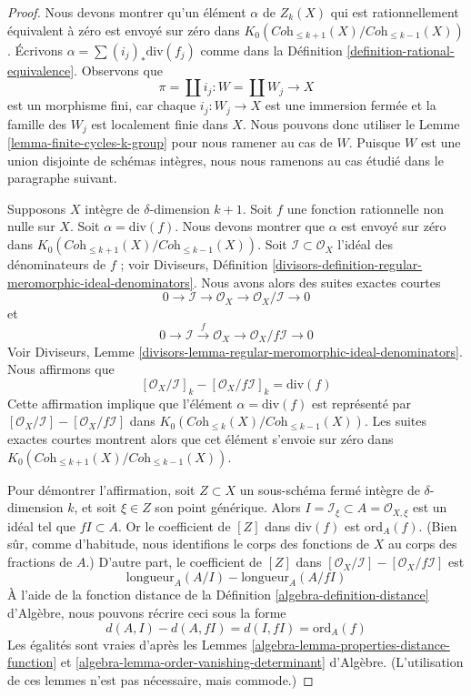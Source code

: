 \begin{proof}
Nous devons montrer qu'un élément $\alpha$ de $Z_k(X)$ qui est rationnellement
équivalent à zéro est envoyé sur zéro dans
$K_0(\textit{Coh}_{\leq k + 1}(X)/\textit{Coh}_{\leq k - 1}(X))$.
Écrivons $\alpha = \sum (i_j)_*\text{div}(f_j)$ comme dans la
Définition \ref{definition-rational-equivalence}.
Observons que
$$
\pi = \coprod i_j : W = \coprod W_j \longrightarrow X
$$
est un morphisme fini, car chaque $i_j : W_j \to X$ est une immersion fermée
et la famille des $W_j$ est localement finie dans $X$. Nous pouvons donc utiliser le
Lemme \ref{lemma-finite-cycles-k-group} pour nous ramener au cas de $W$.
Puisque $W$ est une union disjointe de schémas intègres, nous nous ramenons
au cas étudié dans le paragraphe suivant.

\medskip\noindent
Supposons $X$ intègre de $\delta$-dimension $k + 1$.
Soit $f$ une fonction rationnelle non nulle sur $X$.
Soit $\alpha = \text{div}(f)$. Nous devons montrer que
$\alpha$ est envoyé sur zéro dans
$K_0(\textit{Coh}_{\leq k + 1}(X)/\textit{Coh}_{\leq k - 1}(X))$.
Soit $\mathcal{I} \subset \mathcal{O}_X$ l'idéal des dénominateurs
de $f$ ; voir Diviseurs, Définition
\ref{divisors-definition-regular-meromorphic-ideal-denominators}.
Nous avons alors des suites exactes courtes
$$
0 \to \mathcal{I} \to \mathcal{O}_X \to \mathcal{O}_X/\mathcal{I} \to 0
$$
et
$$
0 \to \mathcal{I} \xrightarrow{f} \mathcal{O}_X \to
\mathcal{O}_X/f\mathcal{I} \to 0
$$
Voir Diviseurs, Lemme
\ref{divisors-lemma-regular-meromorphic-ideal-denominators}.
Nous affirmons que
$$
[\mathcal{O}_X/\mathcal{I}]_k - [\mathcal{O}_X/f\mathcal{I}]_k =
\text{div}(f)
$$
Cette affirmation implique que l'élément $\alpha = \text{div}(f)$ est représenté par
$[\mathcal{O}_X/\mathcal{I}] - [\mathcal{O}_X/f\mathcal{I}]$
dans $K_0(\textit{Coh}_{\leq k}(X)/\textit{Coh}_{\leq k - 1}(X))$.
Les suites exactes courtes montrent alors que cet élément s'envoie sur
zéro dans $K_0(\textit{Coh}_{\leq k + 1}(X)/\textit{Coh}_{\leq k - 1}(X))$.

\medskip\noindent
Pour démontrer l'affirmation, soit $Z \subset X$ un sous-schéma fermé intègre
de $\delta$-dimension $k$, et soit $\xi \in Z$ son point générique.
Alors $I = \mathcal{I}_\xi \subset A = \mathcal{O}_{X, \xi}$
est un idéal tel que $fI \subset A$. Or le coefficient de
$[Z]$ dans $\text{div}(f)$ est $\text{ord}_A(f)$. (Bien sûr, comme d'habitude,
nous identifions le corps des fonctions de $X$ au corps des fractions de $A$.)
D'autre part, le coefficient de $[Z]$ dans
$[\mathcal{O}_X/\mathcal{I}] - [\mathcal{O}_X/f\mathcal{I}]$
est
$$
\text{longueur}_A(A/I) - \text{longueur}_A(A/fI)
$$
À l'aide de la fonction distance de la
Définition \ref{algebra-definition-distance} d'Algèbre,
nous pouvons récrire ceci sous la forme
$$
d(A, I) - d(A, fI) = d(I, fI) = \text{ord}_A(f)
$$
Les égalités sont vraies d'après les Lemmes
\ref{algebra-lemma-properties-distance-function} et
\ref{algebra-lemma-order-vanishing-determinant} d'Algèbre.
(L'utilisation de ces lemmes n'est pas nécessaire, mais commode.)
\end{proof}

